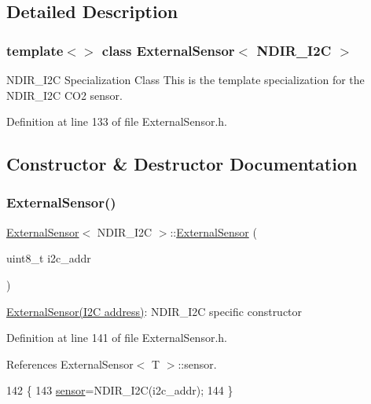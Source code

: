 \subsection{Detailed Description}
\subsubsection*{template$<$$>$\newline
class External\+Sensor$<$ N\+D\+I\+R\+\_\+\+I2\+C $>$}

N\+D\+I\+R\+\_\+\+I2C Specialization Class This is the template specialization for the N\+D\+I\+R\+\_\+\+I2C C\+O2 sensor. 

Definition at line 133 of file External\+Sensor.\+h.



\subsection{Constructor \& Destructor Documentation}
\mbox{\label{classExternalSensor_3_01NDIR__I2C_01_4_aa06970ea689679c0e1deb5360e05a0a4}} 
\subsubsection{\texorpdfstring{External\+Sensor()}{ExternalSensor()}}
{\footnotesize\ttfamily \hyperlink{classExternalSensor}{External\+Sensor}$<$ N\+D\+I\+R\+\_\+\+I2C $>$\+::\hyperlink{classExternalSensor}{External\+Sensor} (\begin{DoxyParamCaption}\item[{uint8\+\_\+t}]{i2c\+\_\+addr }\end{DoxyParamCaption})\hspace{0.3cm}{\ttfamily [inline]}}

\hyperlink{classExternalSensor}{External\+Sensor(\+I2\+C address)}\+: N\+D\+I\+R\+\_\+\+I2C specific constructor 

Definition at line 141 of file External\+Sensor.\+h.



References External\+Sensor$<$ T $>$\+::sensor.


\begin{DoxyCode}
142     \{
143         \hyperlink{classExternalSensor_3_01NDIR__I2C_01_4_ae541c9cece7c38674b70114cdb74a7dc}{sensor}=NDIR\_I2C(i2c\_addr);
144     \}
\end{DoxyCode}


